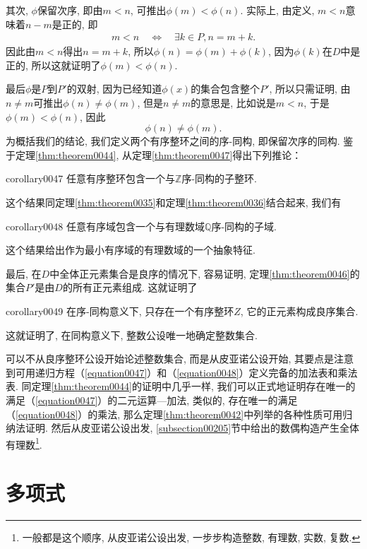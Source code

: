 其次, $\phi$保留次序, 即由$m < n$, 可推出$\phi(m) < \phi(n)$. 实际上, 由定义, $m<n$意味着$n-m$是正的, 即
\begin{gather}\label{equation0049}
m < n \quad \Leftrightarrow\quad \exists k \in P, n=m+k.
\end{gather}
因此由$m<n$得出$n=m+k$, 所以$\phi(n)=\phi(m)+\phi(k)$, 因为$\phi(k)$在$D$中是正的, 所以这就证明了$\phi(m)<\phi(n)$. 

最后$\phi$是$P$到$P'$的双射, 因为已经知道$\phi(x)$的集合包含整个$P'$, 所以只需证明, 由$n \neq m$可推出$\phi(n) \neq \phi(m)$, 但是$n \neq m$的意思是, 比如说是$m < n$, 于是$\phi(m) < \phi(n)$, 因此
\[
\phi(n) \neq \phi(m).
\]
为概括我们的结论, 我们定义两个有序整环之间的序-同构, 即保留次序的同构. 鉴于定理\ref{thm:theorem0044}, 从定理\ref{thm:theorem0047}得出下列推论：
\begin{corollary}{}{corollary0047}
任意有序整环包含一个与$\mathbb{Z}$序-同构的子整环. 
\end{corollary}

这个结果同定理\ref{thm:theorem0035}和定理\ref{thm:theorem0036}结合起来, 我们有
\begin{corollary}{}{corollary0048}
任意有序域包含一个与有理数域$\mathbb{Q}$序-同构的子域. 
\end{corollary}

这个结果给出作为最小有序域的有理数域的一个抽象特征. 

最后, 在$D$中全体正元素集合是良序的情况下, 容易证明, 定理\ref{thm:theorem0046}的集合$P'$是由$D$的所有正元素组成. 这就证明了
\begin{corollary}{}{corollary0049}
在序-同构意义下, 只存在一个有序整环$Z$, 它的正元素构成良序集合. 
\end{corollary}

这就证明了, 在同构意义下, 整数公设唯一地确定整数集合. 

可以不从良序整环公设开始论述整数集合, 而是从皮亚诺公设开始, 其要点是注意到可用递归方程（\ref{equation0047}）和（\ref{equation0048}）定义完备的加法表和乘法表. 同定理\ref{thm:theorem0044}的证明中几乎一样, 我们可以正式地证明存在唯一的满足（\ref{equation0047}）的二元运算---加法, 类似的, 存在唯一的满足（\ref{equation0048}）的乘法, 那么定理\ref{thm:theorem0042}中列举的各种性质可用归纳法证明. 然后从皮亚诺公设出发, \ref{subsection00205}节中给出的数偶构造产生全体有理数\footnote{一般都是这个顺序, 从皮亚诺公设出发, 一步步构造整数, 有理数, 实数, 复数. }. 



\chapter{多项式}\label{section00103}

